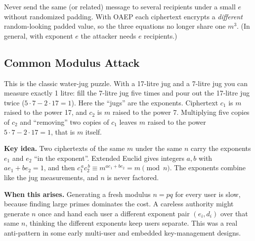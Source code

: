 \documentclass[11pt]{article}
\theoremstyle{definition}
\theoremstyle{remark}
\begin{document}
\begin{fixbox}
Never send the same (or related) message to several recipients under a small $e$ without randomized padding. With OAEP each ciphertext encrypts a \emph{different} random-looking padded value, so the three equations no longer share one $m^3$. (In general, with exponent $e$ the attacker needs $e$ recipients.)
\end{fixbox}

\subsection{Common Modulus Attack}\label{sec:commonmod}

\begin{intuition}
This is the classic water-jug puzzle. With a 17-litre jug and a 7-litre jug you can measure exactly 1 litre: fill the 7-litre jug five times and pour out the 17-litre jug twice ($5\cdot7-2\cdot17=1$). Here the ``jugs'' are the exponents. Ciphertext $c_1$ is $m$ raised to the power 17, and $c_2$ is $m$ raised to the power 7. Multiplying five copies of $c_2$ and ``removing'' two copies of $c_1$ leaves $m$ raised to the power $5\cdot 7-2\cdot 17=1$, that is $m$ itself.
\end{intuition}

\textbf{Key idea.} Two ciphertexts of the same $m$ under the same $n$ carry the exponents $e_1$ and $e_2$ ``in the exponent''. Extended Euclid gives integers $a,b$ with $ae_1+be_2=1$, and then $c_1^{\,a}c_2^{\,b}\equiv m^{ae_1+be_2}=m\pmod n$. The exponents combine like the jug measurements, and $n$ is never factored.

\textbf{When this arises.} Generating a fresh modulus $n=pq$ for every user is slow, because finding large primes dominates the cost. A careless authority might generate $n$ once and hand each user a different exponent pair $(e_i,d_i)$ over that same $n$, thinking the different exponents keep users separate. This was a real anti-pattern in some early multi-user and embedded key-management designs.
\end{document}
